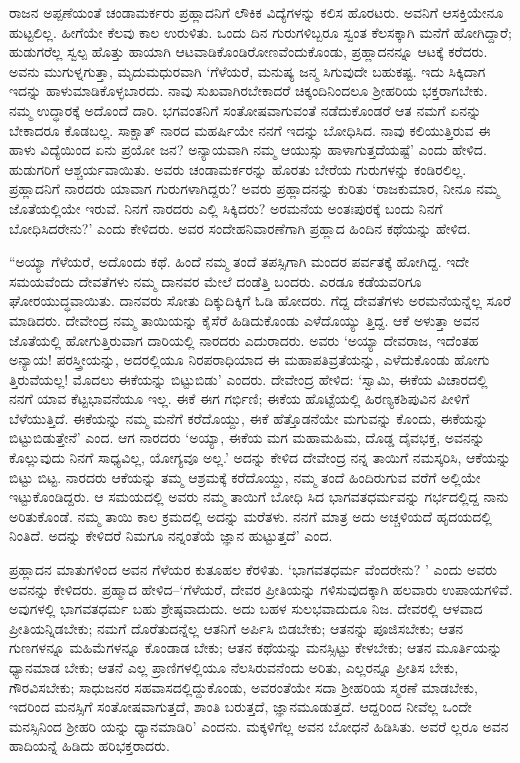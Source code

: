 ರಾಜನ ಅಪ್ಪಣೆಯಂತೆ ಚಂಡಾಮರ್ಕರು ಪ್ರಹ್ಲಾದನಿಗೆ ಲೌಕಿಕ ವಿದ್ಯೆಗಳನ್ನು ಕಲಿಸ ಹೊರಟರು. ಅವನಿಗೆ ಆಸಕ್ತಿಯೇನೂ ಹುಟ್ಟಲಿಲ್ಲ. ಹೀಗೆಯೇ ಕೆಲವು ಕಾಲ ಉರುಳಿತು. ಒಂದು ದಿನ ಗುರುಗಳಿಬ್ಬರೂ ಸ್ವಂತ ಕೆಲಸಕ್ಕಾಗಿ ಮನೆಗೆ ಹೋಗಿದ್ದಾರೆ; ಹುಡುಗರೆಲ್ಲ ಸ್ವಲ್ಪ ಹೊತ್ತು ಹಾಯಾಗಿ ಆಟವಾಡಿಕೊಂಡಿರೋಣವೆಂದುಕೊಂಡು, ಪ್ರಹ್ಲಾದನನ್ನೂ ಆಟಕ್ಕೆ ಕರೆದರು. ಅವನು ಮುಗುಳ್ನಗುತ್ತಾ, ಮೃದುಮಧುರವಾಗಿ ‘ಗೆಳೆಯರೆ, ಮನುಷ್ಯ ಜನ್ಮ ಸಿಗುವುದೇ ಬಹುಕಷ್ಟ. ಇದು ಸಿಕ್ಕಿದಾಗ ಇದನ್ನು ಹಾಳುಮಾಡಿಕೊಳ್ಳಬಾರದು. ನಾವು ಸುಖವಾಗಿರಬೇಕಾದರೆ ಚಿಕ್ಕಂದಿನಿಂದಲೂ ಶ್ರೀಹರಿಯ ಭಕ್ತರಾಗಬೇಕು. ನಮ್ಮ ಉದ್ಧಾರಕ್ಕೆ ಅದೊಂದೆ ದಾರಿ. ಭಗವಂತನಿಗೆ ಸಂತೋಷವಾಗುವಂತೆ ನಡೆದುಕೊಂಡರೆ ಆತ ನಮಗೆ ಏನನ್ನು ಬೇಕಾದರೂ ಕೊಡಬಲ್ಲ. ಸಾಕ್ಷಾತ್ ನಾರದ ಮಹರ್ಷಿಯೇ ನನಗೆ ಇದನ್ನು ಬೋಧಿಸಿದ. ನಾವು ಕಲಿಯುತ್ತಿರುವ ಈ ಹಾಳು ವಿದ್ಯೆಯಿಂದ ಏನು ಪ್ರಯೋ ಜನ? ಅನ್ಯಾಯವಾಗಿ ನಮ್ಮ ಆಯುಸ್ಸು ಹಾಳಾಗುತ್ತದೆಯಷ್ಟೆ’ ಎಂದು ಹೇಳಿದ. ಹುಡುಗರಿಗೆ ಆಶ್ಚರ್ಯವಾಯಿತು. ಅವರು ಚಂಡಾಮರ್ಕರನ್ನು ಹೊರತು ಬೇರೆಯ ಗುರುಗಳನ್ನು ಕಂಡಿರಲಿಲ್ಲ. ಪ್ರಹ್ಲಾದನಿಗೆ ನಾರದರು ಯಾವಾಗ ಗುರುಗಳಾಗಿದ್ದರು? ಅವರು ಪ್ರಹ್ಲಾದನನ್ನು ಕುರಿತು ‘ರಾಜಕುಮಾರ, ನೀನೂ ನಮ್ಮ ಜೊತೆಯಲ್ಲಿಯೇ ಇರುವೆ. ನಿನಗೆ ನಾರದರು ಎಲ್ಲಿ ಸಿಕ್ಕಿದರು? ಅರಮನೆಯ ಅಂತಃಪುರಕ್ಕೆ ಬಂದು ನಿನಗೆ ಬೋಧಿಸಿದರೇನು?’ ಎಂದು ಕೇಳಿದರು. ಅವರ ಸಂದೇಹನಿವಾರಣೆಗಾಗಿ ಪ್ರಹ್ಲಾದ ಹಿಂದಿನ ಕಥೆಯನ್ನು ಹೇಳಿದ.

“ಅಯ್ಯಾ ಗೆಳೆಯರೆ, ಅದೊಂದು ಕಥೆ. ಹಿಂದೆ ನಮ್ಮ ತಂದೆ ತಪಸ್ಸಿಗಾಗಿ ಮಂದರ ಪರ್ವತಕ್ಕೆ ಹೋಗಿದ್ದ. ಇದೇ ಸಮಯವೆಂದು ದೇವತೆಗಳು ನಮ್ಮ ದಾನವರ ಮೇಲೆ ದಂಡೆತ್ತಿ ಬಂದರು. ಎರಡೂ ಕಡೆಯವರಿಗೂ ಘೋರಯುದ್ಧವಾಯಿತು. ದಾನವರು ಸೋತು ದಿಕ್ಕುದಿಕ್ಕಿಗೆ ಓಡಿ ಹೋದರು. ಗೆದ್ದ ದೇವತೆಗಳು ಅರಮನೆಯನ್ನೆಲ್ಲ ಸೂರೆ ಮಾಡಿದರು. ದೇವೇಂದ್ರ ನಮ್ಮ ತಾಯಿಯನ್ನು ಕೈಸೆರೆ ಹಿಡಿದುಕೊಂಡು ಎಳೆದೊಯ್ಯು ತ್ತಿದ್ದ. ಆಕೆ ಅಳುತ್ತಾ ಅವನ ಜೊತೆಯಲ್ಲಿ ಹೋಗುತ್ತಿರುವಾಗ ದಾರಿಯಲ್ಲಿ ನಾರದರು ಎದುರಾದರು. ಅವರು ‘ಅಯ್ಯಾ ದೇವರಾಜ, ಇದೆಂತಹ ಅನ್ಯಾಯ! ಪರಸ್ತ್ರೀಯನ್ನು, ಅದರಲ್ಲಿಯೂ ನಿರಪರಾಧಿಯಾದ ಈ ಮಹಾಪತಿವ್ರತೆಯನ್ನು, ಎಳೆದುಕೊಂಡು ಹೋಗು ತ್ತಿರುವೆಯಲ್ಲ! ಮೊದಲು ಈಕೆಯನ್ನು ಬಿಟ್ಟುಬಿಡು’ ಎಂದರು. ದೇವೇಂದ್ರ ಹೇಳಿದ: ‘ಸ್ವಾಮಿ, ಈಕೆಯ ವಿಚಾರದಲ್ಲಿ ನನಗೆ ಯಾವ ಕೆಟ್ಟಭಾವನೆಯೂ ಇಲ್ಲ. ಈಕೆ ಈಗ ಗರ್ಭಿಣಿ; ಈಕೆಯ ಹೊಟ್ಟೆಯಲ್ಲಿ ಹಿರಣ್ಯಕಶಿಪುವಿನ ಪೀಳಿಗೆ ಬೆಳೆಯುತ್ತಿದೆ. ಈಕೆಯನ್ನು ನಮ್ಮ ಮನೆಗೆ ಕರೆದೊಯ್ದು, ಈಕೆ ಹೆತ್ತೊಡನೆಯೇ ಮಗುವನ್ನು ಕೊಂದು, ಈಕೆಯನ್ನು ಬಿಟ್ಟುಬಿಡುತ್ತೇನೆ’ ಎಂದ. ಆಗ ನಾರದರು ‘ಅಯ್ಯಾ, ಈಕೆಯ ಮಗ ಮಹಾಮಹಿಮ, ದೊಡ್ಡ ದೈವಭಕ್ತ, ಅವನನ್ನು ಕೊಲ್ಲುವುದು ನಿನಗೆ ಸಾಧ್ಯವಿಲ್ಲ, ಯೋಗ್ಯವೂ ಅಲ್ಲ.’ ಅದನ್ನು ಕೇಳಿದ ದೇವೇಂದ್ರ ನನ್ನ ತಾಯಿಗೆ ನಮಸ್ಕರಿಸಿ, ಆಕೆಯನ್ನು ಬಿಟ್ಟು ಬಿಟ್ಟ. ನಾರದರು ಆಕೆಯನ್ನು ತಮ್ಮ ಆಶ್ರಮಕ್ಕೆ ಕರೆದೊಯ್ದು, ನಮ್ಮ ತಂದೆ ಹಿಂದಿರುಗುವ ವರೆಗೆ ಅಲ್ಲಿಯೇ ಇಟ್ಟುಕೊಂಡಿದ್ದರು. ಆ ಸಮಯದಲ್ಲಿ ಅವರು ನಮ್ಮ ತಾಯಿಗೆ ಬೋಧಿ ಸಿದ ಭಾಗವತಧರ್ಮವನ್ನು ಗರ್ಭದಲ್ಲಿದ್ದ ನಾನು ಅರಿತುಕೊಂಡೆ. ನಮ್ಮ ತಾಯಿ ಕಾಲ ಕ್ರಮದಲ್ಲಿ ಅದನ್ನು ಮರೆತಳು. ನನಗೆ ಮಾತ್ರ ಅದು ಅಚ್ಚಳಿಯದೆ ಹೃದಯದಲ್ಲಿ ನಿಂತಿದೆ. ಅದನ್ನು ಕೇಳಿದರೆ ನಿಮಗೂ ನನ್ನಂತೆಯೆ ಜ್ಞಾನ ಹುಟ್ಟುತ್ತದೆ’ ಎಂದ.

ಪ್ರಹ್ಲಾದನ ಮಾತುಗಳಿಂದ ಅವನ ಗೆಳೆಯರ ಕುತೂಹಲ ಕೆರಳಿತು. ‘ಭಾಗವತಧರ್ಮ ವೆಂದರೇನು? ’ ಎಂದು ಅವರು ಅವನನ್ನು ಕೇಳಿದರು. ಪ್ರಹ್ಮಾದ ಹೇಳಿದ–‘ಗೆಳೆಯರೆ, ದೇವರ ಪ್ರೀತಿಯನ್ನು ಗಳಿಸುವುದಕ್ಕಾಗಿ ಹಲವಾರು ಉಪಾಯಗಳಿವೆ. ಅವುಗಳಲ್ಲಿ ಭಾಗವತಧರ್ಮ ಬಹು ಶ್ರೇಷ್ಠವಾದುದು. ಅದು ಬಹಳ ಸುಲಭವಾದುದೂ ನಿಜ. ದೇವರಲ್ಲಿ ಆಳವಾದ ಪ್ರೀತಿಯನ್ನಿಡಬೇಕು; ನಮಗೆ ದೊರೆತುದನ್ನೆಲ್ಲ ಆತನಿಗೆ ಅರ್ಪಿಸಿ ಬಿಡಬೇಕು; ಆತನನ್ನು ಪೂಜಿಸಬೇಕು; ಆತನ ಗುಣಗಳನ್ನೂ ಮಹಿಮೆಗಳನ್ನೂ ಕೊಂಡಾಡ ಬೇಕು; ಆತನ ಕಥೆಯನ್ನು ಮನಸ್ಸಿಟ್ಟು ಕೇಳಬೇಕು; ಆತನ ಮೂರ್ತಿಯನ್ನು ಧ್ಯಾನಮಾಡ ಬೇಕು; ಆತನೆ ಎಲ್ಲ ಪ್ರಾಣಿಗಳಲ್ಲಿಯೂ ನೆಲಸಿರುವನೆಂದು ಅರಿತು, ಎಲ್ಲರನ್ನೂ ಪ್ರೀತಿಸ ಬೇಕು, ಗೌರವಿಸಬೇಕು; ಸಾಧುಜನರ ಸಹವಾಸದಲ್ಲಿದ್ದುಕೊಂಡು, ಅವರಂತೆಯೇ ಸದಾ ಶ್ರೀಹರಿಯ ಸ್ಮರಣೆ ಮಾಡಬೇಕು, ಇದರಿಂದ ಮನಸ್ಸಿಗೆ ಸಂತೋಷವಾಗುತ್ತದೆ, ಶಾಂತಿ ಬರುತ್ತದೆ, ಜ್ಞಾನಮೂಡುತ್ತದೆ. ಆದ್ದರಿಂದ ನೀವೆಲ್ಲ ಒಂದೇ ಮನಸ್ಸಿನಿಂದ ಶ್ರೀಹರಿ ಯನ್ನು ಧ್ಯಾನಮಾಡಿರಿ’ ಎಂದನು. ಮಕ್ಕಳಿಗೆಲ್ಲ ಅವನ ಬೋಧನೆ ಹಿಡಿಸಿತು. ಅವರೆ ಲ್ಲರೂ ಅವನ ಹಾದಿಯನ್ನೆ ಹಿಡಿದು ಹರಿಭಕ್ತರಾದರು.

